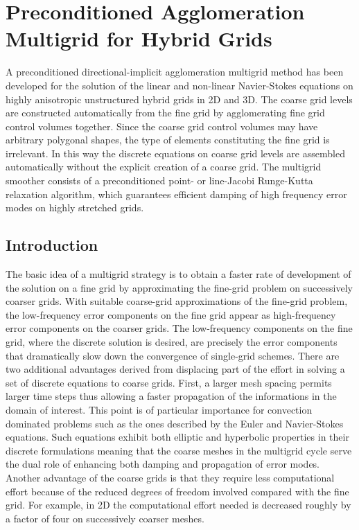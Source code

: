 %
%
%
%
\chapter{Preconditioned Agglomeration Multigrid for Hybrid Grids}
\label{multigrid.chap}
\setcounter{footnote}{0}
%
%
%
 A preconditioned directional-implicit agglomeration multigrid method
 has been developed for the solution of the linear and non-linear
 Navier-Stokes equations on highly anisotropic unstructured hybrid grids
 in 2D and 3D. The coarse grid levels are constructed
 automatically from the fine grid by agglomerating fine grid control
 volumes together. Since the coarse grid control volumes may have arbitrary
 polygonal shapes, the type of elements constituting the fine grid is
 irrelevant. In this way the discrete equations on coarse grid levels
 are assembled automatically without the explicit creation of a coarse grid.
 The multigrid smoother consists of a preconditioned
 point- or line-Jacobi Runge-Kutta relaxation algorithm, which guarantees
 efficient damping of high frequency error modes on highly stretched grids.
%
%
%
%
\section{Introduction}
%
 The basic idea of a multigrid strategy
 is to obtain a faster rate of development of the solution on a fine grid
 by approximating the fine-grid problem on successively coarser grids.
 With suitable coarse-grid approximations of the fine-grid problem, the
 low-frequency error components on the fine grid appear as high-frequency
 error components on the coarser grids. The low-frequency components on the
 fine grid, where the discrete solution is desired, are precisely the error
 components that dramatically slow down the convergence of single-grid schemes.
 There are two additional advantages derived from displacing part of the
 effort in solving a set of discrete equations to coarse grids.
 First, a larger mesh spacing permits larger time steps thus allowing a faster
 propagation of the informations in the domain of interest.
 This point is of particular importance for convection dominated problems
 such as the ones described by the Euler and Navier-Stokes equations.
 Such equations exhibit both elliptic and hyperbolic properties in their
 discrete formulations meaning that the coarse meshes in the multigrid cycle
 serve the dual role of enhancing both damping and propagation of error
 modes.
 Another advantage of the coarse grids is that they require less computational
 effort because of the reduced degrees of freedom involved compared with
 the fine grid. For example, in 2D the computational effort needed
 is decreased roughly by a factor of four on successively coarser meshes.


